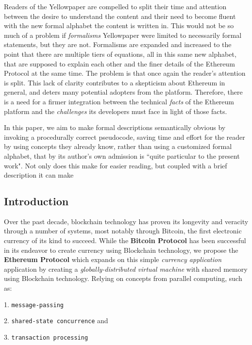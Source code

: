 \documentclass[11pt,a4paper,leqno,bibliography=totoc]{scrartcl}
\newenvironment{alphafootnotes}
    {\par\edef\savedfootnotenumber{\number\value{footnote}}
    \renewcommand{\thefootnote}{\alph{footnote}}
     \setcounter{footnote}{0}}
    {\par\setcounter{footnote}{\savedfootnotenumber}}
\begin{document}
\begin{alphafootnotes}
	  Readers of the Yellowpaper are compelled to split their time and attention between the desire to understand the content and their need to become fluent with the new formal alphabet the content is written in. This would not be so much of a problem if \textit{formalisms} Yellowpaper were limited to necessarily formal statements, but they are not. Formalisms are expanded and increased to the point that there are multiple tiers of equations, all in this same new alphabet, that are supposed to explain each other and the finer details of the Ethereum Protocol at the same time. The problem is that once again the reader's attention is split. This lack of clarity contributes to a skepticism about Ethereum in general, and deters many potential adopters from the platform. Therefore, there is a need for a firmer integration between the technical \textsl{facts} of the Ethereum platform and the \textsl{challenges} its developers must face in light of those facts.
\par

	  In this paper, we aim to make formal descriptions semantically obvious by invoking a procedurally correct pseudocode, saving time and effort for the reader by using concepts they already know, rather than using a customized formal alphabet, that by its author's own admission is ``quite particular to the present work"\autocite{Wood2017}. Not only does this make for easier reading, but coupled with a brief description it can make
\begin{multicols}{2}
\justify

	\section{Introduction}Over the past decade, blockchain technology has proven its longevity and veracity through a number of systems, most notably through Bitcoin, the first electronic currency of its kind to succeed. While the \textbf{Bitcoin Protocol} has been successful in its endeavor to create currency using Blockchain technology, we propose the \textbf{Ethereum Protocol} which expands on this simple \textsl{currency application} application by creating a \textit{globally-distributed virtual machine} with shared memory using Blockchain technology. Relying on concepts from parallel computing, such as:


1. \texttt{message-passing} \par
2. \texttt{shared-state concurrence} and \par
3. \texttt{transaction processing} \par



\end{multicols}
\end{alphafootnotes}
\end{document}
